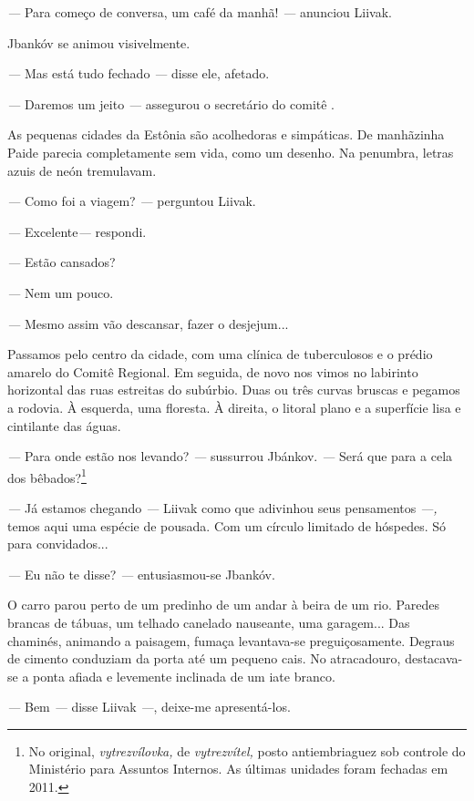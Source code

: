 \emph{---} Para começo de conversa, um café da manhã! \emph{---}
anunciou Liivak.

Jbankóv se animou visivelmente.

\emph{---} Mas está tudo fechado \emph{---} disse ele, afetado.

\emph{---} Daremos um jeito \emph{---} assegurou o secretário do comitê
.

As pequenas cidades da Estônia são acolhedoras e simpáticas. De
manhãzinha Paide parecia completamente sem vida, como um desenho. Na
penumbra, letras azuis de neón tremulavam.

\emph{---} Como foi a viagem? \emph{---} perguntou Liivak.

\emph{---} Excelente\emph{---} respondi.

\emph{---} Estão cansados?

\emph{---} Nem um pouco.

\emph{---} Mesmo assim vão descansar, fazer o desjejum...

Passamos pelo centro da cidade, com uma clínica de tuberculosos e o
prédio amarelo do Comitê Regional. Em seguida, de novo nos vimos no
labirinto horizontal das ruas estreitas do subúrbio. Duas ou três curvas
bruscas e pegamos a rodovia. À esquerda, uma floresta. À direita, o
litoral plano e a superfície lisa e cintilante das águas.

\emph{---} Para onde estão nos levando? \emph{---} sussurrou Jbánkov.
\emph{---} Será que para a cela dos bêbados?\footnote{No original,
  \emph{vytrezvílovka,} de \emph{vytrezvítel,} posto antiembriaguez sob
  controle do Ministério para Assuntos Internos. As últimas unidades
  foram fechadas em 2011.}

\emph{---} Já estamos chegando \emph{---} Liivak como que adivinhou seus
pensamentos \emph{---,} temos aqui uma espécie de pousada. Com um
círculo limitado de hóspedes. Só para convidados...

\emph{---} Eu não te disse? \emph{---} entusiasmou-se Jbankóv.

O carro parou perto de um predinho de um andar à beira de um rio.
Paredes brancas de tábuas, um telhado canelado nauseante, uma garagem...
Das chaminés, animando a paisagem, fumaça levantava-se preguiçosamente.
Degraus de cimento conduziam da porta até um pequeno cais. No
atracadouro, destacava-se a ponta afiada e levemente inclinada de um
iate branco.

\emph{---} Bem \emph{---} disse Liivak \emph{---}, deixe-me
apresentá-los.

